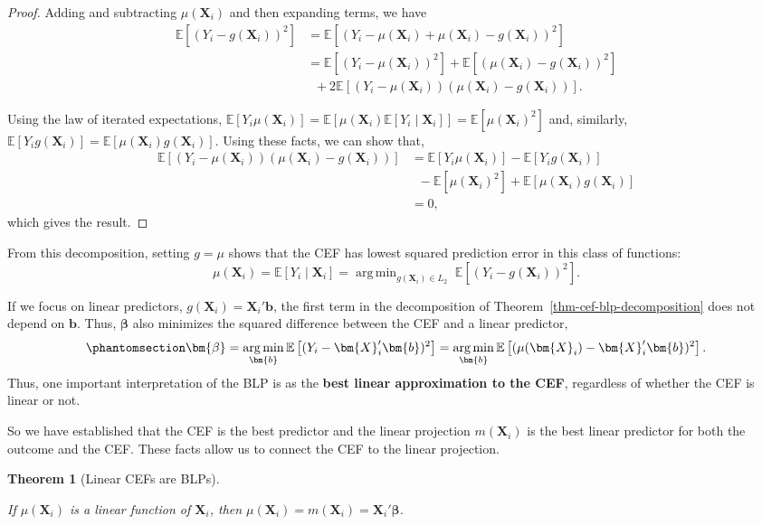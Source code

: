 \documentclass[
  13pt,
  letterpaper,
  DIV=11,
  numbers=noendperiod]{scrreprt}
\newcommand{\mb}{\bm}
\newcommand{\E}{\mathbb{E}}
\newcommand{\X}{\mb{X}}
\newcommand{\bfbeta}{\mb{\beta}}
\DeclareMathOperator*{\argmin}{arg\,min}
\theoremstyle{plain}
\newtheorem{theorem}{Theorem}[chapter]
\theoremstyle{plain}
\theoremstyle{definition}
\theoremstyle{definition}
\theoremstyle{remark}
\begin{document}
\begin{proof}
Adding and subtracting \(\mu(\X_i)\) and then expanding terms, we have
\[
\begin{aligned}
\E\left[(Y_{i} - g(\X_{i}))^{2}\right] &= \E\left[(Y_{i} - \mu(\X_i) + \mu(\X_i) - g(\X_{i}))^{2}\right] \\
&= \E\left[(Y_{i} - \mu(\X_{i}))^{2}\right] + \E\left[(\mu(\X_i) - g(\X_{i}))^{2}\right] \\ &\;\;+ 2\E\left[(Y_i - \mu(\X_i))(\mu(\X_i) - g(\X_i))\right].
\end{aligned}
\]

Using the law of iterated expectations,
\(\E[Y_i\mu(\X_i)] = \E[\mu(\X_i)\E[Y_i \mid \X_i]] = \E[\mu(\X_i)^2]\)
and, similarly, \(\E[Y_ig(\X_i)] = \E[\mu(\X_i)g(\X_i)]\). Using these
facts, we can show that, \[
\begin{split}
\E\left[(Y_i - \mu(\X_i))(\mu(\X_i) - g(\X_i))\right] &= \E[Y_i\mu(\X_i)] - \E[Y_ig(\X_i)] \\ & \;\; - \E[\mu(\X_i)^2] + \E[\mu(\X_i)g(\X_i)] \\ &= 0,
\end{split}
\] which gives the result.
\end{proof}

From this decomposition, setting \(g = \mu\) shows that the CEF has
lowest squared prediction error in this class of functions: \[ 
\mu(\X_i) = \E[Y_{i} \mid \X_{i}] = \argmin_{g(\X_i) \in L_2}\; \E\left[(Y_{i} - g(\X_{i}))^{2}\right].
\]

If we focus on linear predictors, \(g(\X_i) = \X_i'\mb{b}\), the first
term in the decomposition of Theorem~\ref{thm-cef-blp-decomposition}
does not depend on \(\mb{b}\). Thus, \(\bfbeta\) also minimizes the
squared difference between the CEF and a linear predictor,
\begin{equation}\protect\phantomsection\label{eq-blp-predicts-cef}{
\bfbeta = \argmin_{\mb{b}} \E\left[(Y_i - \X_i'\mb{b})^2\right] = \argmin_{\mb{b}} \E\left[(\mu(\X_i) - \X_i'\mb{b})^2\right].
}\end{equation} Thus, one important interpretation of the BLP is as the
\textbf{best linear approximation to the CEF}, regardless of whether the
CEF is linear or not.

So we have established that the CEF is the best predictor and the linear
projection \(m(\X_{i})\) is the best linear predictor for both the
outcome and the CEF. These facts allow us to connect the CEF to the
linear projection.

\begin{theorem}[Linear CEFs are
BLPs]\protect\hypertarget{thm-cef-blp}{}\label{thm-cef-blp}

If \(\mu(\X_{i})\) is a linear function of \(\X_i\), then
\(\mu(\X_{i}) = m(\X_{i}) = \X_i'\bfbeta\).

\end{theorem}
\end{document}
